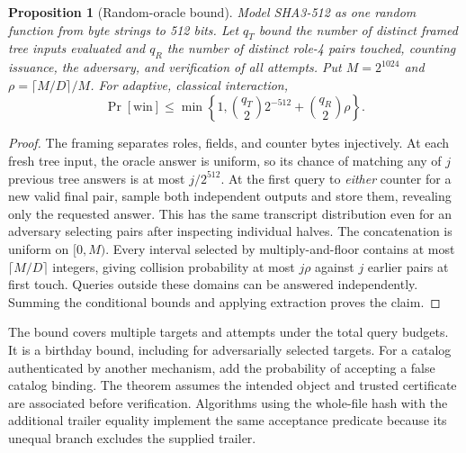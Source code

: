 \documentclass[10pt,twocolumn,letterpaper]{article}
\newtheorem{prop}{Proposition}
\begin{document}
\begin{prop}[Random-oracle bound]
Model SHA3-512 as one random function from byte strings to 512 bits. Let \(q_T\) bound the number of distinct framed tree inputs evaluated and \(q_R\) the number of distinct role-4 pairs touched, counting issuance, the adversary, and verification of all attempts. Put \(M=2^{1024}\) and \(\rho=\lceil M/D\rceil/M\). For adaptive, classical interaction,
\[
 \Pr[\mathrm{win}]\le
 \min\!\left\{1,\binom{q_T}{2}2^{-512}
                   +\binom{q_R}{2}\rho\right\}.
\]
\end{prop}
\begin{proof}
The framing separates roles, fields, and counter bytes injectively. At each fresh tree input, the oracle answer is uniform, so its chance of matching any of \(j\) previous tree answers is at most \(j/2^{512}\). At the first query to \emph{either} counter for a new valid final pair, sample both independent outputs and store them, revealing only the requested answer. This has the same transcript distribution even for an adversary selecting pairs after inspecting individual halves. The concatenation is uniform on \([0,M)\). Every interval selected by multiply-and-floor contains at most \(\lceil M/D\rceil\) integers, giving collision probability at most \(j\rho\) against \(j\) earlier pairs at first touch. Queries outside these domains can be answered independently. Summing the conditional bounds and applying extraction proves the claim.\end{proof}
The bound covers multiple targets and attempts under the total query budgets. It is a birthday bound, including for adversarially selected targets. For a catalog authenticated by another mechanism, add the probability of accepting a false catalog binding. The theorem assumes the intended object and trusted certificate are associated before verification. Algorithms using the whole-file hash with the additional trailer equality implement the same acceptance predicate because its unequal branch excludes the supplied trailer.
\end{document}

